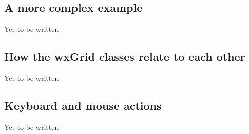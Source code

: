 \subsection{A more complex example}\label{complexwxgridexample}
Yet to be written

\subsection{How the wxGrid classes relate to each other}\label{wxgridclassesrelations}
Yet to be written

\subsection{Keyboard and mouse actions}\label{keyboardandmouseinwxgrid}
Yet to be written

